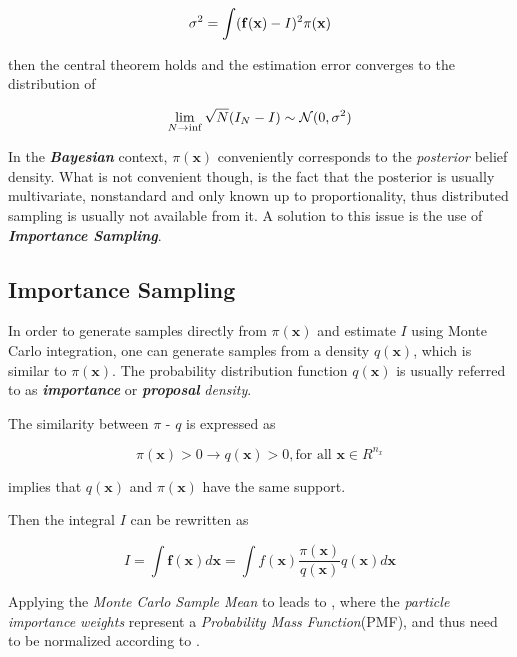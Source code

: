 \[ {\sigma^2} = \int (\mathbf{f}(\mathbf{x})- I)^2 \pi(\mathbf{x}) \]


then the central theorem holds and the estimation error converges to the distribution of 

\begin{equation}\label{eq:MCI4}
\lim_{N\rightarrow \inf} \sqrt{N}(I_N - I) \sim \mathcal{N}(0,
{\sigma^2})
\end{equation}


In the \textbf{\emph{Bayesian}} context, $\pi(\mathbf{x})$ conveniently corresponds to the \emph{posterior} belief density. What is not convenient though, is the fact that the posterior is usually multivariate, nonstandard and only known up to proportionality, thus distributed sampling is usually not available from it. A solution to this issue is the use of \emph{\textbf{Importance Sampling}}.

\subsection{Importance Sampling}

In order to generate samples directly from $\pi (\mathbf{x})$ and estimate $I$ using Monte Carlo integration, one can generate samples from a density $q(\mathbf{x})$, which is similar to $\pi(\mathbf{x})$. The probability distribution function $q(\mathbf{x})$ is usually referred to as \emph{\textbf{importance }}or \emph{\textbf{proposal}} \emph{density}.


The similarity between $\pi \text{ - } q $ is expressed as

\begin{equation}\label{eq:proposal1}
\pi(\mathbf{x}) > 0 \rightarrow q(\mathbf{x})>0 , \text{for all } \mathbf{x} \in R^{n_x}
\end{equation}

  implies that $q(\mathbf{x})$ and $\pi(\mathbf{x})$ have the same support.

Then the integral $I$ can be rewritten as

\begin{equation}\label{eq:MCIntegral}
I = \int \mathbf{f}(\mathbf{x}) d\mathbf{x} = \int f(\mathbf{x}) \frac{\pi(\mathbf{x})}{q(\mathbf{x})}q(\mathbf{x}) d\mathbf{x}
\end{equation}


Applying the \emph{Monte Carlo Sample Mean} to  leads to  , where the \emph{particle importance weights} represent a \emph{Probability Mass Function}(PMF), and thus need to be normalized according to .




